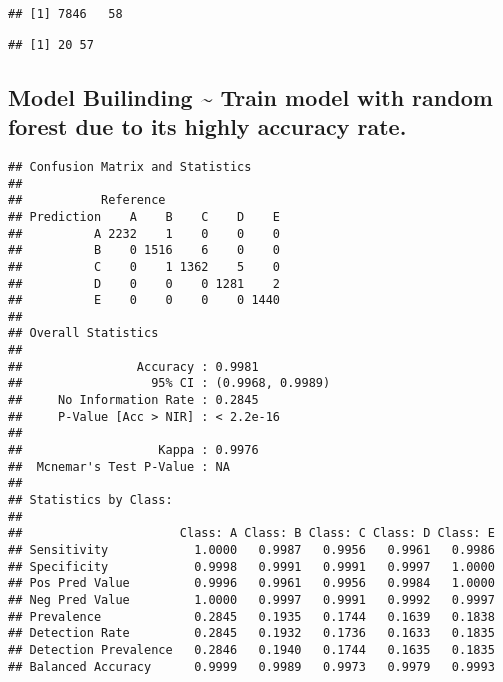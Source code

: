 \documentclass[]{article}
\newenvironment{Shaded}{\begin{snugshade}}{\end{snugshade}}
\newcommand{\KeywordTok}[1]{\textcolor[rgb]{0.13,0.29,0.53}{\textbf{{#1}}}}
\newcommand{\DataTypeTok}[1]{\textcolor[rgb]{0.13,0.29,0.53}{{#1}}}
\newcommand{\StringTok}[1]{\textcolor[rgb]{0.31,0.60,0.02}{{#1}}}
\newcommand{\NormalTok}[1]{{#1}}
\begin{document}
\begin{verbatim}
## [1] 7846   58
\end{verbatim}

\begin{verbatim}
## [1] 20 57
\end{verbatim}

\subsection{Model Builinding \textasciitilde{} Train model with random
forest due to its highly accuracy
rate.}\label{model-builinding-train-model-with-random-forest-due-to-its-highly-accuracy-rate.}

\begin{Shaded}
\end{Shaded}

\begin{verbatim}
## Confusion Matrix and Statistics
## 
##           Reference
## Prediction    A    B    C    D    E
##          A 2232    1    0    0    0
##          B    0 1516    6    0    0
##          C    0    1 1362    5    0
##          D    0    0    0 1281    2
##          E    0    0    0    0 1440
## 
## Overall Statistics
##                                           
##                Accuracy : 0.9981          
##                  95% CI : (0.9968, 0.9989)
##     No Information Rate : 0.2845          
##     P-Value [Acc > NIR] : < 2.2e-16       
##                                           
##                   Kappa : 0.9976          
##  Mcnemar's Test P-Value : NA              
## 
## Statistics by Class:
## 
##                      Class: A Class: B Class: C Class: D Class: E
## Sensitivity            1.0000   0.9987   0.9956   0.9961   0.9986
## Specificity            0.9998   0.9991   0.9991   0.9997   1.0000
## Pos Pred Value         0.9996   0.9961   0.9956   0.9984   1.0000
## Neg Pred Value         1.0000   0.9997   0.9991   0.9992   0.9997
## Prevalence             0.2845   0.1935   0.1744   0.1639   0.1838
## Detection Rate         0.2845   0.1932   0.1736   0.1633   0.1835
## Detection Prevalence   0.2846   0.1940   0.1744   0.1635   0.1835
## Balanced Accuracy      0.9999   0.9989   0.9973   0.9979   0.9993
\end{verbatim}
\end{document}
